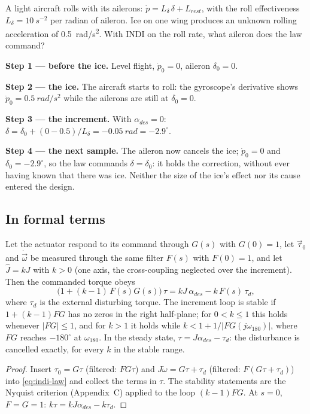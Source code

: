 \begin{example}
\label{ex:indi-aircraft}
A light aircraft rolls with its ailerons: $\dot p = L_\delta\,\delta + L_{rest}$, with the roll effectiveness $L_\delta = \SI{10}{s^{-2}}$ per radian of aileron. Ice on one wing produces an unknown rolling acceleration of \SI{0.5}{rad/s^2}. With INDI on the roll rate, what aileron does the law command?

\textbf{Step 1 — before the ice.} Level flight, $\dot p_0 = 0$, aileron $\delta_0 = 0$.

\textbf{Step 2 — the ice.} The aircraft starts to roll: the gyroscope's derivative shows $\dot p_0 = \SI{0.5}{rad/s^2}$ while the ailerons are still at $\delta_0 = 0$.

\textbf{Step 3 — the increment.} With $\alpha_{des} = 0$: $\delta = \delta_0 + (0 - 0.5)/L_\delta = \SI{-0.05}{rad} = -2.9^\circ$.

\textbf{Step 4 — the next sample.} The aileron now cancels the ice; $\dot p_0 = 0$ and $\delta_0 = -2.9^\circ$, so the law commands $\delta = \delta_0$: it holds the correction, without ever having known that there was ice. Neither the size of the ice's effect nor its cause entered the design.
\end{example}

\subsection{In formal terms}

\begin{theorem}
\label{thm:indi-loop}
Let the actuator respond to its command through $G(s)$ with $G(0) = 1$, let $\vec\tau_0$ and $\dot{\vec\omega}$ be measured through the same filter $F(s)$ with $F(0) = 1$, and let $\hat J = kJ$ with $k > 0$ (one axis, the cross-coupling neglected over the increment). Then the commanded torque obeys
\begin{equation*}
  \big(1 + (k - 1)\,F(s)G(s)\big)\,\tau = kJ\,\alpha_{des} - k\,F(s)\,\tau_d ,
\end{equation*}
where $\tau_d$ is the external disturbing torque. The increment loop is stable if $1 + (k - 1)FG$ has no zeros in the right half-plane; for $0 < k \le 1$ this holds whenever $|FG| \le 1$, and for $k > 1$ it holds while $k < 1 + 1/|FG(j\omega_{180})|$, where $FG$ reaches $-180^\circ$ at $\omega_{180}$. In the steady state, $\tau = J\alpha_{des} - \tau_d$: the disturbance is cancelled exactly, for every $k$ in the stable range.
\end{theorem}
\begin{proof}
Insert $\tau_0 = G\tau$ (filtered: $FG\tau$) and $J\dot\omega = G\tau + \tau_d$ (filtered: $F(G\tau + \tau_d)$) into \cref{eq:indi-law} and collect the terms in $\tau$. The stability statements are the Nyquist criterion (Appendix~C) applied to the loop $(k - 1)FG$. At $s = 0$, $F = G = 1$: $k\tau = kJ\alpha_{des} - k\tau_d$.
\end{proof}

